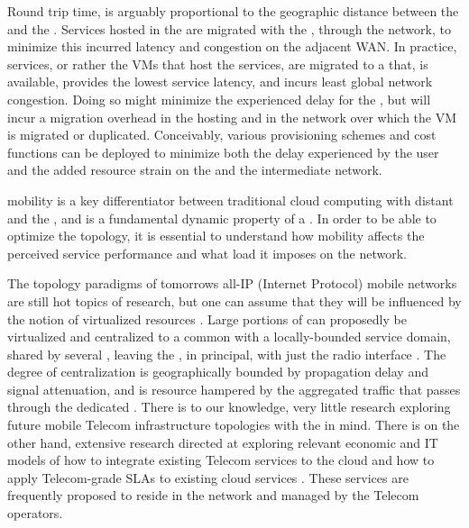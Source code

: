 Round trip time, is arguably proportional to the geographic distance between the \ue{} and the \dc{}. Services hosted in the \xcloud{} are migrated with the \ue{}, through the network, to minimize this incurred latency and congestion on the adjacent WAN. In practice, services, or rather the VMs that host the services, are migrated to a \dc{} that, is available, provides the lowest service latency, and incurs least global network congestion. Doing so might minimize the experienced delay for the \ue{}, but will incur a migration overhead in the hosting \dc{} and in the network over which the VM is migrated or duplicated. Conceivably, various provisioning schemes and cost functions can be deployed to minimize both the delay experienced by the user and the added resource strain on the \dc{} and the intermediate network.

\Ue{} mobility is a key differentiator between traditional cloud computing with distant \dcs{} and the \xcloud{}, and is a fundamental dynamic property of a \xcloud{}. In order to be able to optimize the \xcloud{} topology, it is essential to understand how \ue{} mobility affects the perceived service performance and what load it imposes on the network.

The topology paradigms of tomorrows all-IP (Internet Protocol) mobile networks \cite{6144211,5357099} are still hot topics of research, but one can assume that they will be influenced by the notion of virtualized resources \cite{baroncelli2010network, chowdhury2009network}. Large portions of \rbss{} can proposedly be virtualized and centralized to a common \dc{} with a locally-bounded service domain, shared by several \rbss{}, leaving the \rbss{}, in principal, with just the radio interface \cite{melzercloud}. The degree of centralization is geographically bounded by propagation delay and signal attenuation, and is resource hampered by the aggregated traffic that passes through the dedicated \dc{}. There is to our knowledge, very little research exploring future mobile Telecom infrastructure topologies with the \xcloud{} in mind. There is on the other hand, extensive research directed at exploring relevant economic and IT models of how to integrate existing Telecom services to the cloud and how to apply Telecom-grade SLAs to existing cloud services \cite{EricssonWhitePaper,6156350, 5357099}. These services are frequently proposed to reside in the network and managed by the Telecom operators.

